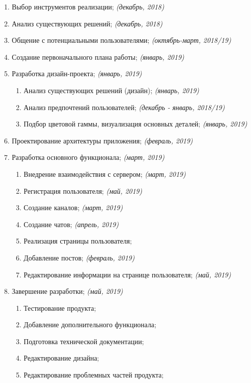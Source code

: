     \begin{enumerate}
        \item  Выбор инструментов реализации; \textit{(декабрь, 2018)}
        \item  Анализ существующих решений;   \textit{(декабрь, 2018)}
        \item  Общение с потенциальными пользователями; \textit{(октябрь-март, 2018/19)}
        \item  Создание первоначального плана работы; \textit{(январь, 2019)}
        \item  Разработка дизайн-проекта; \textit{(январь, 2019)}
        \begin{enumerate}
            \item  Анализ существующих решений (дизайн); \textit{(январь, 2019)}
            \item  Анализ предпочтений пользователей; \textit{(декабрь - январь, 2018/19)}
            \item  Подбор цветовой гаммы, визуализация основных деталей; \textit{(январь, 2019)}
        \end{enumerate}
        \item  Проектирование архитектуры приложения; \textit{(февраль, 2019)}
        \item  Разработка основного функционала; \textit{(март, 2019)}
        \begin{enumerate}
            \item  Внедрение взаимодействия с сервером; \textit{(март, 2019)}
            \item  Регистрация пользователя; \textit{(май, 2019)}
            \item  Создание каналов; \textit{(март, 2019)}
            \item  Создание чатов;  \textit{(апрель, 2019)}
            \item  Реализация страницы пользователя; 
			 \item  Добавление постов; \textit{(февраль, 2019)}
            \item  Редактирование информации на странице пользователя; \textit{(май, 2019)}


        \end{enumerate}
        \item  Завершение разработки; \textit{(май, 2019)}
        \begin{enumerate}
            \item  Тестирование продукта;
            \item  Добавление дополнительного функционала; 
            \item  Подготовка технической документации;
            \item  Редактирование дизайна; 
            \item  Редактирование проблемных частей продукта; 
        \end{enumerate}
        \end{enumerate}

